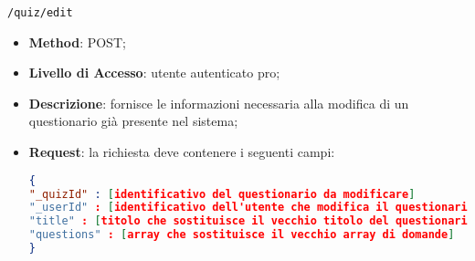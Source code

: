 	\item \texttt{/quiz/edit}
		\begin{itemize}
			\item \textbf{Method}: POST;
			\item \textbf{Livello di Accesso}: utente autenticato pro;
			\item \textbf{Descrizione}: fornisce le informazioni necessaria alla modifica di un questionario già presente nel sistema;
			\item \textbf{Request}: la richiesta deve contenere i seguenti campi:
\begin{lstlisting}[language=json,firstnumber=1]
{
"_quizId" : [identificativo del questionario da modificare]
"_userId" : [identificativo dell'utente che modifica il questionario ovvero colui che lo ha anche creato]
"title" : [titolo che sostituisce il vecchio titolo del questionario]
"questions" : [array che sostituisce il vecchio array di domande]
}
\end{lstlisting}
		\end{itemize}
